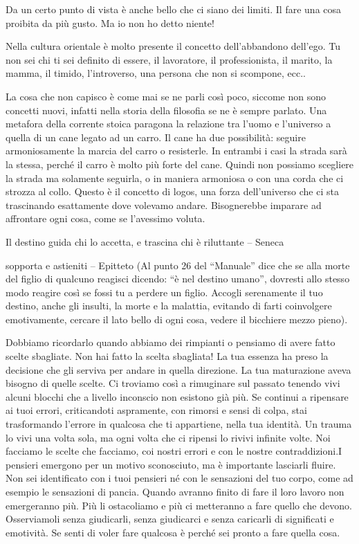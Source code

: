 \documentclass[12pt]{book} %
\begin{document}
Da un certo punto di vista è anche bello che ci siano dei limiti. Il fare una cosa proibita da più gusto. Ma io non ho
detto niente!

Nella cultura orientale è molto presente il concetto dell'abbandono dell'ego.
Tu non sei chi ti sei definito di essere, il lavoratore, il professionista, il marito, la mamma, il timido,
l'introverso, una persona che non si scompone, ecc.. 

La cosa che non capisco è come mai se ne parli così poco, siccome non sono concetti nuovi, infatti nella storia della
filosofia se ne è sempre parlato. Una metafora della corrente stoica paragona la relazione tra
l'uomo e l'universo a quella di un cane legato ad un carro. Il cane ha due
possibilità: seguire armoniosamente la marcia del carro o resisterle. In entrambi i casi la strada sarà la stessa,
perché il carro è molto più forte del cane. Quindi non possiamo scegliere la strada ma solamente seguirla, o in maniera
armoniosa o con una corda che ci strozza al collo. Questo è il concetto di logos, una forza dell'universo che ci sta
trascinando esattamente dove volevamo andare. Bisognerebbe imparare ad affrontare ogni cosa, come se l'avessimo voluta.

Il destino guida chi lo accetta, e trascina chi è riluttante – Seneca

sopporta e astieniti – Epitteto (Al punto 26 del “Manuale” dice che se alla morte del figlio di qualcuno reagisci
dicendo: “è nel destino umano”, dovresti allo stesso modo reagire così se fossi tu a perdere un figlio. Accogli
serenamente il tuo destino, anche gli insulti, la morte e la malattia, evitando di farti coinvolgere emotivamente,
cercare il lato bello di ogni cosa, vedere il bicchiere mezzo pieno).

Dobbiamo ricordarlo quando abbiamo dei rimpianti o pensiamo di avere fatto scelte sbagliate. Non hai fatto la scelta
sbagliata! La tua essenza ha preso la decisione che gli serviva per andare in quella direzione. La tua maturazione
aveva bisogno di quelle scelte. Ci troviamo così a rimuginare sul passato tenendo vivi alcuni blocchi che a livello
inconscio non esistono già più. Se continui a ripensare ai tuoi errori, criticandoti aspramente, con rimorsi e sensi di
colpa, stai trasformando l'errore in qualcosa che ti appartiene, nella tua identità. Un trauma lo
vivi una volta sola, ma ogni volta che ci ripensi lo rivivi infinite volte. Noi facciamo le scelte che facciamo, coi
nostri errori e con le nostre contraddizioni.I pensieri emergono per un motivo sconosciuto, ma è importante lasciarli
fluire. Non sei identificato con i tuoi pensieri né con le sensazioni del tuo corpo, come ad esempio le sensazioni di
pancia. Quando avranno finito di fare il loro lavoro non emergeranno più. Più li ostacoliamo e più ci metteranno a fare
quello che devono. Osserviamoli senza giudicarli, senza giudicarci e senza caricarli di significati e emotività. Se
senti di voler fare qualcosa è perché sei pronto a fare quella cosa.
\end{document}
